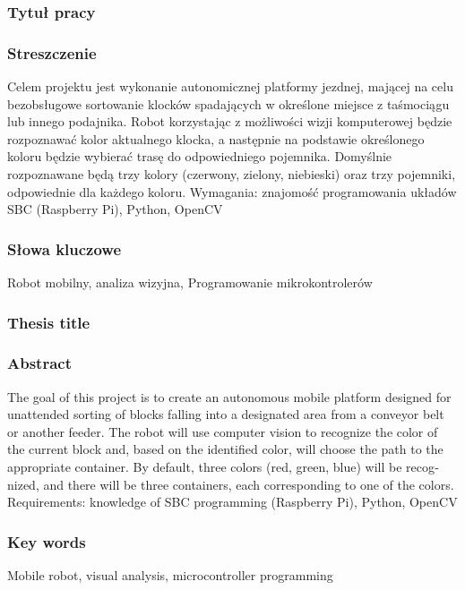\subsubsection*{Tytuł pracy} 
\Title

\subsubsection*{Streszczenie}  
Celem projektu jest wykonanie autonomicznej platformy jezdnej, mającej na celu
bezobsługowe sortowanie klocków spadających w określone miejsce z taśmociągu lub
innego podajnika. Robot korzystając z możliwości wizji komputerowej będzie
rozpoznawać kolor aktualnego klocka, a następnie na podstawie określonego koloru
będzie wybierać trasę do odpowiedniego pojemnika. Domyślnie rozpoznawane będą trzy
kolory (czerwony, zielony, niebieski) oraz trzy pojemniki, odpowiednie dla każdego koloru.
Wymagania: znajomość programowania układów SBC (Raspberry Pi), Python, OpenCV


\subsubsection*{Słowa kluczowe} 
Robot mobilny, analiza wizyjna, Programowanie mikrokontrolerów

\subsubsection*{Thesis title} 
\begin{otherlanguage}{british}
\TitleAlt
\end{otherlanguage}

\subsubsection*{Abstract} 
\begin{otherlanguage}{british}
    The goal of this project is to create an autonomous mobile platform designed for
    unattended sorting of blocks falling into a designated area from a conveyor belt or
    another feeder. The robot will use computer vision to recognize the color of the
    current block and, based on the identified color, will choose the path to the
    appropriate container. By default, three colors (red, green, blue) will be recognized,
    and there will be three containers, each corresponding to one of the colors.
    Requirements: knowledge of SBC programming (Raspberry Pi), Python, OpenCV
\end{otherlanguage}
\subsubsection*{Key words}  
\begin{otherlanguage}{british}
Mobile robot, visual analysis, microcontroller programming
\end{otherlanguage}


